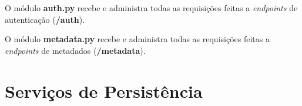 \documentclass[12pt, openright, oneside, a4paper, brazil]{abntex2}
\begin{document}
\begin{apendicesenv}
O módulo \textbf{auth.py} recebe e administra todas as requisições feitas a \textit{endpoints} de autenticação (\textbf{/auth}).



O módulo \textbf{metadata.py} recebe e administra todas as requisições feitas a \textit{endpoints} de metadados (\textbf{/metadata}).



\section{Serviços de Persistência} \label{services}



\end{apendicesenv}
\end{document}
